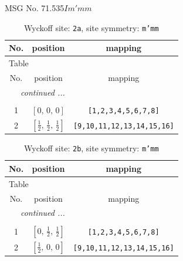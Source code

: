 \documentclass[fleqn,8pt]{jsarticle}
\begin{document}
\setcounter{MaxMatrixCols}{32}

\renewcommand{\tablename}{Table~}
\renewcommand{\figurename}{Figure~}
\begin{center}
\LARGE
MSG No. 71.535\quad$Im'mm$
\end{center}
\renewcommand{\arraystretch}{1.2}
\begin{longtable}{ccc}
\caption{Wyckoff site: {\tt 2a}, site symmetry: {\tt m'mm}}
 \\
 \hline \hline
No. & position & mapping \\ \hline \endfirsthead

\multicolumn{2}{l}{\tablename\ \thetable{}} \\
 \hline \hline
No. & position & mapping \\ \hline \endhead

 \hline \hline
\multicolumn{2}{r}{\footnotesize\it continued ...} \\ \endfoot

 \hline \hline
\multicolumn{2}{r}{} \\ \endlastfoot

1 & $\left[ 0,\, 0,\, 0 \right]$ & {\tt [1,2,3,4,5,6,7,8]} \\ \hline
2 & $\left[ \frac{1}{2},\, \frac{1}{2},\, \frac{1}{2} \right]$ & {\tt [9,10,11,12,13,14,15,16]} \\
\end{longtable}
\renewcommand{\arraystretch}{1.2}
\begin{longtable}{ccc}
\caption{Wyckoff site: {\tt 2b}, site symmetry: {\tt m'mm}}
 \\
 \hline \hline
No. & position & mapping \\ \hline \endfirsthead

\multicolumn{2}{l}{\tablename\ \thetable{}} \\
 \hline \hline
No. & position & mapping \\ \hline \endhead

 \hline \hline
\multicolumn{2}{r}{\footnotesize\it continued ...} \\ \endfoot

 \hline \hline
\multicolumn{2}{r}{} \\ \endlastfoot

1 & $\left[ 0,\, \frac{1}{2},\, \frac{1}{2} \right]$ & {\tt [1,2,3,4,5,6,7,8]} \\ \hline
2 & $\left[ \frac{1}{2},\, 0,\, 0 \right]$ & {\tt [9,10,11,12,13,14,15,16]} \\
\end{longtable}
\end{document}
